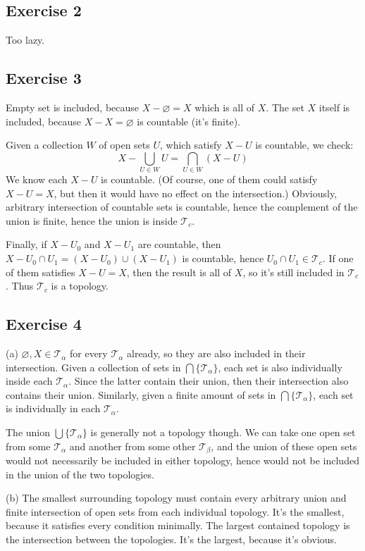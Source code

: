 \documentclass{book}
\begin{document}
\subsection*{Exercise 2}
Too lazy.

\subsection*{Exercise 3}
Empty set is included, because $X - \varnothing = X$ which is all of $X$. The set $X$ itself is included, because $X - X = \varnothing$ is countable (it's finite).

Given a collection $W$ of open sets $U$, which satisfy $X - U$ is countable, we check:
$$X - \bigcup_{U \in W} U = \bigcap_{U \in W} (X - U)$$
We know each $X - U$ is countable. (Of course, one of them could satisfy $X - U = X$, but then it would have no effect on the intersection.) Obviously, arbitrary intersection of countable sets is countable, hence the complement of the union is finite, hence the union is inside $\mathcal{T}_c$.

Finally, if $X - U_0$ and $X - U_1$ are countable, then $X - U_0 \cap U_1 = (X - U_0) \cup (X - U_1)$ is countable, hence $U_0 \cap U_1 \in \mathcal{T}_c$. If one of them satisfies $X - U = X$, then the result is all of $X$, so it's still included in $\mathcal{T}_c$. Thus $\mathcal{T}_c$ is a topology.

\subsection*{Exercise 4}
(a)
$\varnothing, X \in \mathcal{T}_\alpha$ for every $\mathcal{T}_\alpha$ already, so they are also included in their intersection. Given a collection of sets in $\bigcap \{ \mathcal{T}_\alpha \}$, each set is also individually inside each $\mathcal{T}_\alpha$. Since the latter contain their union, then their intersection also contains their union. Similarly, given a finite amount of sets in $\bigcap \{ \mathcal{T}_\alpha \}$, each set is individually in each $\mathcal{T}_\alpha$.

The union $\bigcup \{ \mathcal{T}_\alpha \}$ is generally not a topology though. We can take one open set from some $\mathcal{T}_\alpha$ and another from some other $\mathcal{T}_\beta$, and the union of these open sets would not necessarily be included in either topology, hence would not be included in the union of the two topologies.

\noindent
(b)
The smallest surrounding topology must contain every arbitrary union and finite intersection of open sets from each individual topology. It's the smallest, because it satisfies every condition minimally. The largest contained topology is the intersection between the topologies. It's the largest, because it's obvious.
\end{document}
